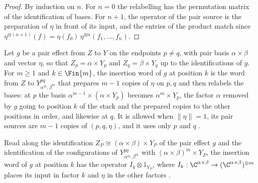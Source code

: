\begin{proof}\leanok
    By induction on $n$. For $n=0$ the relabelling has the permutation matrix of
    the identification of bases. For $n+1$, the operator of the pair source is the
    preparation of $\eta$ in front of its input, and the entries of the product
    match since
    $\eta^{\otimes(n+1)}(f)=\eta(f_0)\,\eta^{\otimes n}(f_1,\dots,f_n)$.
\end{proof}

\begin{definition}
    \label{def:party_insertion_word}
    \leanok
    Let $g$ be a pair effect from $Z$ to $Y$ on the endpoints $p\ne q$, with pair
    basis $\alpha\times\beta$ and vector $\eta$, so that $Z_p=\alpha\times Y_p$ and
    $Z_q=\beta\times Y_q$ up to the identifications of $g$. For $m\ge1$ and
    $k\in\Fin{m}$, the insertion word of $g$ at position $k$ is the word from $Z$ to
    $Y^{pq}_{\alpha^m,\beta^m}$ that prepares $m-1$ copies of $\eta$ on $p,q$ and
    then relabels the bases: at $p$ the basis
    $\alpha^{m-1}\times(\alpha\times Y_p)$ becomes $\alpha^m\times Y_p$, the factor
    $\alpha$ removed by $g$ going to position $k$ of the stack and the prepared
    copies to the other positions in order, and likewise at $q$. It is allowed when
    $\lVert\eta\rVert=1$, its pair sources are $m-1$ copies of $(p,q,\eta)$, and it
    uses only $p$ and $q$ \cite[Lemma~5.1]{OpenAI2026PolynomialPEPS}.
\end{definition}

\begin{theorem}
    \label{thm:party_op_insertion_word}
    \leanok
    Read along the identification $Z_P\cong(\alpha\times\beta)\times Y_P$ of the pair
    effect $g$ and the identification of the configurations of
    $Y^{pq}_{\alpha^m,\beta^m}$ with $(\alpha\times\beta)^m\times Y_P$, the insertion
    word of $g$ at position $k$ has the operator $I_k\otimes1_{Y_P}$, where
    $I_k:\C^{\alpha\times\beta}\to(\C^{\alpha\times\beta})^{\otimes m}$ places its
    input in factor $k$ and $\eta$ in the other factors
    \cite[Lemma~5.1]{OpenAI2026PolynomialPEPS}.
\end{theorem}

